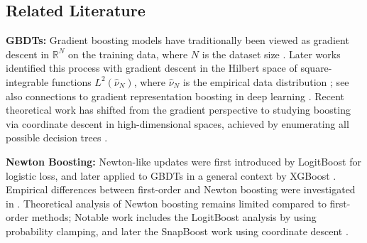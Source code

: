 \documentclass{article}
\theoremstyle{plain}
\theoremstyle{definition}
\theoremstyle{remark}
\begin{document}
\subsection{Related Literature}


\textbf{GBDTs:} Gradient boosting models have traditionally been viewed as gradient descent in $\mathbb{R}^N$ on the training data, where $N$ is the dataset size \cite{1999BoostingAlgorithmsAsGradientDescent, 2000LogitBoostAdditiveLogisticRegressionAStatisticalViewOfBoosting}. Later works identified this process with gradient descent in the Hilbert space of square-integrable functions $L^2(\widehat{\nu}_N)$, where $\widehat{\nu}_N$ is the empirical data distribution \cite{2011GeneralizedBoostingAlgorithmsForConvexOptimization}; see also connections to gradient representation boosting in deep learning \cite{2018FunctionalGradientBoostingResNet, 2020GeneralizedBoosting, 2025RandomFeatureRepresentationBoosting}. Recent theoretical work has shifted from the gradient perspective to studying boosting via coordinate descent in high-dimensional spaces, achieved by enumerating all possible decision trees \cite{2019RegularizedGradientBoosting, 2020RandomizedGradientBoostingMachine, 2020SnapBoostAHeterogeneousBoostingMachine}.



\textbf{Newton Boosting:} Newton-like updates were first introduced by LogitBoost \cite{2000LogitBoostAdditiveLogisticRegressionAStatisticalViewOfBoosting} for logistic loss, and later applied to GBDTs in a general context by XGBoost \cite{2016XGBoost}. Empirical differences between first-order and Newton boosting were investigated in \cite{2021GradientAndNewtonBoostingForClassificationAndRegression}. Theoretical analysis of Newton boosting remains limited compared to first-order methods; Notable work includes the LogitBoost analysis by \citet{2014AConvergenceRateAnalysisForLogitBoostMARTAndTheirVariant} using probability clamping, and later the SnapBoost work using coordinate descent \cite{2020SnapBoostAHeterogeneousBoostingMachine}.
\end{document}
